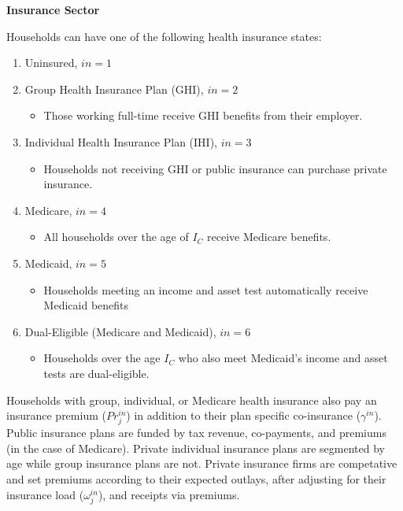 \documentclass[11pt,leqno,fleqn]{article}
\begin{document}
\begin{flushleft}
\textbf{Insurance Sector}
\end{flushleft}
Households can have one of the following health insurance states:
\begin{enumerate}
	\item Uninsured, $in=1$
	\item Group Health Insurance Plan (GHI), $in=2$
	\begin{itemize}
		\item Those working full-time receive GHI benefits from their employer.
	\end{itemize}
	\item Individual Health Insurance Plan (IHI), $in=3$
	\begin{itemize}
		\item Households not receiving GHI or public insurance can purchase private insurance.
	\end{itemize}
	\item Medicare, $in=4$
	\begin{itemize}
		\item All households over the age of $I_C$ receive Medicare benefits.
	\end{itemize}
	\item Medicaid, $in=5$
	\begin{itemize}
		\item Households meeting an income and asset test automatically receive Medicaid benefits
	\end{itemize}
	\item Dual-Eligible (Medicare and Medicaid), $in=6$
	\begin{itemize}
		\item Households over the age $I_C$ who also meet Medicaid's income and asset tests are dual-eligible.
	\end{itemize}
\end{enumerate}

Households with group, individual, or Medicare health insurance also pay an insurance premium ($Pr_j^{in}$) in addition to their plan specific co-insurance ($\gamma^{in}$). Public insurance plans are funded by tax revenue, co-payments, and premiums (in the case of Medicare). Private individual insurance plans are segmented by age while group insurance plans are not. Private insurance firms are competative and set premiums according to their expected outlays, after adjusting for their insurance load ($\omega_j^{in}$), and receipts via premiums.
\end{document}
